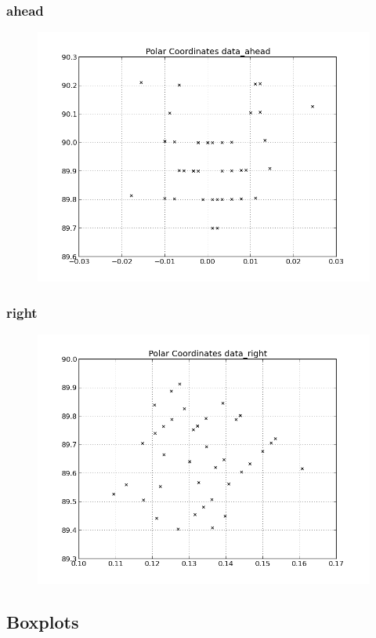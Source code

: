 \documentclass{scrartcl}
\begin{document}
\subsubsection{ahead}
\begin{figure}[H]
  \centering
  \includegraphics[width=0.5\linewidth]{img/data_ahead_pc.png}
\end{figure}

\subsubsection{right}
\begin{figure}[H]
  \centering
  \includegraphics[width=0.5\linewidth]{img/data_right_pc.png}
\end{figure}


\subsection{Boxplots}
\end{document}
